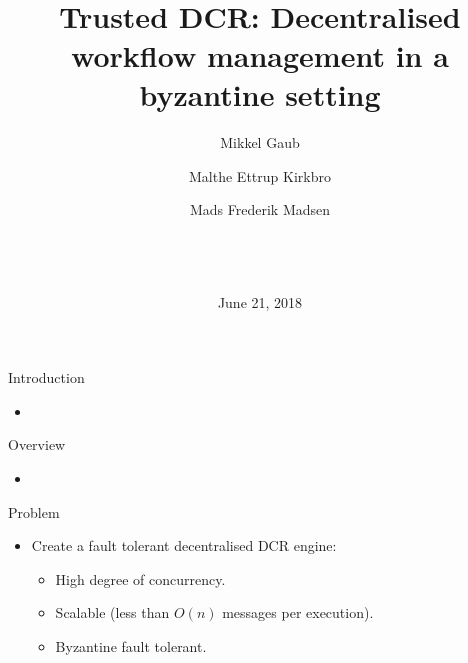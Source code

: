 \documentclass{beamer}
\title{~\\ ~\\ ~\\ Trusted DCR: Decentralised workflow management in a byzantine setting}
\author{Mikkel Gaub \and Malthe Ettrup Kirkbro \and Mads Frederik Madsen}
\date{~\\ ~\\ ~\\ \center June 21, 2018 }
\begin{document}
\maketitle

\begin{frame}{Introduction}%
%
    \begin{itemize}
    	\item 
    \end{itemize}
\end{frame}

\begin{frame}{Overview}%
	\begin{itemize}
		\item 
	\end{itemize}
\end{frame}

\begin{frame}{Problem}%
\begin{itemize}
	\item Create a fault tolerant decentralised DCR engine:

	\vfill

	\begin{itemize}
		\item High degree of concurrency.
	
		\vfill

		\item Scalable (less than $O(n)$ messages per execution).
	
		\vfill
		
		\item Byzantine fault tolerant.
	\end{itemize}
\end{itemize}
\end{frame}
\end{document}
